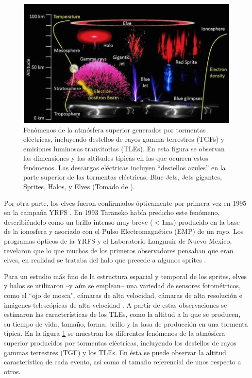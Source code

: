 \documentclass[12pt,oneside,openany,letter]{book}
\begin{document}
\begin{figure}
    \centering
    \includegraphics[scale=0.75]{figures/tle_and_tgf.png}
    \caption[Fenómenos de la atmósfera superior generados por tormentas eléctricas]{Fenómenos de la atmósfera superior generados por tormentas eléctricas, incluyendo destellos de rayos gamma terrestres (TGFs) y emisiones luminosas transitorias (TLEs). En esta figura se observan las dimensiones y las altitudes típicas en las que ocurren estos fenómenos. Las descargas eléctricas incluyen ``destellos azules'' en la parte superior de las tormentas eléctricas, Blue Jets, Jets gigantes, Sprites, Halos, y Elves (Tomado de \cite{Gaskill2018}).}
    \label{fig:tle_and_tgf}
\end{figure}

Por otra parte, los elves fueron confirmados ópticamente por primera vez en 1995 en la campaña YRFS \cite{FukunishiEtal1996}. En 1993 Taraneko \cite{TaranenkoEtal1993} había predicho este fenómeno, describiéndolo como un brillo intenso muy breve ($<1$ms) producido en la base de la ionosfera y asociado con el Pulso Electromagnético (EMP) de un rayo. Los programas ópticos de la YRFS y el Laboratorio Langmuir de Nuevo Mexico, revelaron que lo que muchos de los primeros observadores pensaban que eran elves, en realidad se trataba del halo que precede a algunos sprites \cite{FullekrugEtal2006}. 

Para un estudio más fino de la estructura espacial y temporal de los sprites, elves y halos se utilizaron --y aún se emplean-- una variedad de sensores fotométricos, como el ``ojo de mosca", cámaras de alta velocidad, cámaras de alta resolución e imágenes telescópicas de alta velocidad \cite{FullekrugEtal2006}. A partir de estas observaciones se estimaron las características de los TLEs, como la altitud a la que se producen, su tiempo de vida, tamaño, forma, brillo y la tasa de producción en una tormenta típica. En la figura \ref{fig:tle_and_tgf} se muestran los diferentes fenómenos de la atmósfera superior producidos por tormentas eléctricas, incluyendo los destellos de rayos gammas terrestres (TGF) y los TLEs. En ésta se puede observar la altitud característica de cada evento, así como el tamaño referencial de unos respecto a otros. 
\end{document}
